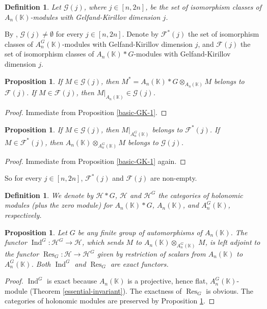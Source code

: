 \documentclass[12pt, a4paper]{amsart}
\newtheorem{proposition}[theorem]{Proposition}
\newtheorem{definition}[theorem]{Definition}
\newcommand{\Weyl}{A_n(\mathbb{K})} %
\newcommand{\Invar}{A_n^G(\mathbb{K})}           %
\def\G{\mathcal G}
\def\Gskew{\mathcal{F}}
\def\Ginv{\mathcal{F}^*}
\def\H{\mathcal H}
\begin{document}
\begin{definition}
    Let $\G(j)$, where $j \in [n, 2n]$, be the set of isomorphism classes of $\Weyl$-modules with Gelfand-Kirillov dimension $j$.
\end{definition}
By \cite[Exercise 9.5.3]{Coutinho}, $\G(j) \neq \emptyset$ for every $j \in [n, 2n]$. Denote by $\Ginv(j)$ the set of isomorphism classes of $\Invar$-modules with Gelfand-Kirillov dimension $j$, and $\Gskew(j)$ the set of isomorphism classes of $\Weyl*G$-modules with Gelfand-Kirillov dimension $j$.
\begin{proposition}\label{g-skew}
    If $M \in \G(j)$, then $M^*=\Weyl*G \otimes_{\Weyl} M$ belongs to $\Gskew(j)$. If $M \in \Gskew(j)$, then $M|_{\Weyl} \in \G(j)$.
\end{proposition}
\begin{proof}
    Immediate from Proposition \ref{basic-GK-1}.
\end{proof}
\begin{proposition}\label{g-inv}
    If $M \in \G(j)$, then $M|_{\Invar} $ belongs to $\Ginv(j)$. If $M \in \Ginv(j)$, then $\Weyl \otimes_{\Invar} M$ belongs to $\G(j)$.
\end{proposition}
\begin{proof}
    Immediate from Proposition \ref{basic-GK-1} again.
\end{proof}
So for every $j \in [n,2n]$, $\Ginv(j)$ and $\Gskew(j)$ are non-empty.
\begin{definition}
    We denote by $\H*G$, $\H$ and $\H^G$ the categories of holonomic modules (plus the zero module) for $\Weyl*G$, $\Weyl$, and $\Invar$, respectively.
\end{definition}
\begin{proposition}
 Let $G$ be any finite group of automorphisms of $\Weyl$. The functor $\operatorname{Ind}^G: \mathcal{H}^G \rightarrow \mathcal{H}$, which sends $M$ to $\Weyl \otimes_{\Invar} \, M$, is left adjoint to the functor $\operatorname{Res}_G: \mathcal{H} \rightarrow \mathcal{H}^G$ given by restriction of scalars from $\Weyl$ to $\Invar$. Both $\operatorname{Ind}^G$ and $\operatorname{Res}_G$ are exact functors.
\end{proposition}
\begin{proof}
    $\operatorname{Ind}^G$ is exact because $\Weyl$ is a projective, hence flat, $\Invar$-module (Theorem \ref{essential-invariant}). The exactness of $\operatorname{Res}_G$ is obvious. The categories of holonomic modules are preserved by Proposition \ref{g-inv}.
\end{proof}
\end{document}
